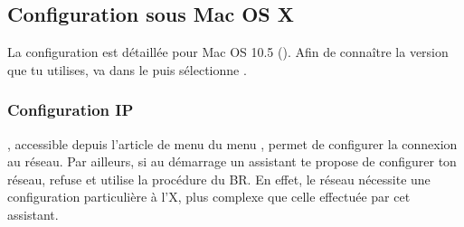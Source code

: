 



\subsection{Configuration sous Mac OS X}

La configuration est d\'etaill\'ee pour Mac OS 10.5 (). %
Afin de conna\^itre la version que tu utilises, va dans le  puis s\'electionne .

\subsubsection{Configuration IP}

 , accessible depuis l'article de menu  du menu , permet de configurer la connexion au r\'eseau. Par ailleurs, si au d\'emarrage un assistant te propose de configurer ton r\'eseau, refuse et utilise la proc\'edure du BR. En effet, le r\'eseau n\'ecessite une configuration particuli\`ere  \`a l'X, plus complexe que celle effectu\'ee par cet assistant.


